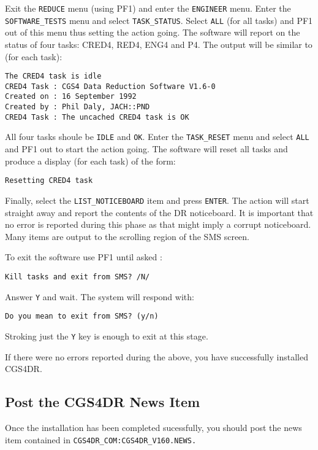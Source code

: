Exit the {\tt REDUCE} menu (using PF1)  and enter the {\tt ENGINEER} menu. 
Enter the {\tt SOFTWARE\_TESTS} menu and select {\tt TASK\_STATUS}. Select 
{\tt ALL} (for all tasks) and PF1 out of this menu thus setting the action 
going. The software will report on the status of four tasks: CRED4, RED4, 
ENG4 and P4. The output will be similar to (for each task):

\begin{verbatim}
The CRED4 task is idle
CRED4 Task : CGS4 Data Reduction Software V1.6-0
Created on : 16 September 1992
Created by : Phil Daly, JACH::PND
CRED4 Task : The uncached CRED4 task is OK
\end{verbatim}

All four tasks shoule be {\tt IDLE} and {\tt OK}. Enter the {\tt TASK\_RESET} 
menu and select {\tt ALL} and PF1 out to start the action going. The software 
will reset all tasks and produce a display (for each task) of the form:

\begin{verbatim}
Resetting CRED4 task
\end{verbatim}

Finally, select the {\tt LIST\_NOTICEBOARD} item and press {\tt ENTER}. The 
action will start straight away and report the contents of the DR noticeboard.
It is important that no error is reported during this phase as that might 
imply a corrupt noticeboard. Many items are output to the scrolling region
of the SMS screen.

To exit the software use PF1 until asked :

\begin{verbatim}
Kill tasks and exit from SMS? /N/
\end{verbatim}

Answer {\tt Y} and wait. The system will respond with:

\begin{verbatim}
Do you mean to exit from SMS? (y/n)
\end{verbatim}

Stroking just the {\tt Y} key is enough to exit at this stage.

If there were no errors reported during the above, you have successfully
installed CGS4DR.

\subsection{Post the CGS4DR News Item}

Once the installation has been completed sucessfully, you should post the
news item contained in {\tt CGS4DR\_COM:CGS4DR\_V160.NEWS.}


